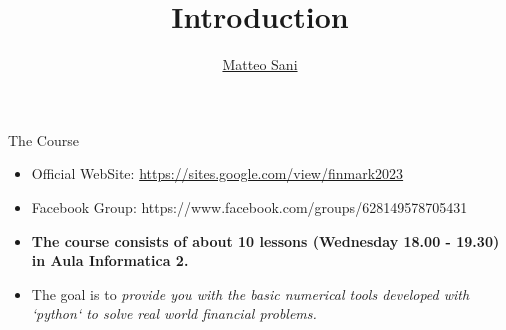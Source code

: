 \documentclass{beamer}
\title{Introduction}
\author{\href{mailto:matteo.sani@unisi.it}{Matteo Sani}}
\begin{document}
\begin{frame}[plain]
	\maketitle
\end{frame}

\begin{frame}{The Course}
  \begin{itemize}
  \item Official WebSite: \href{https://sites.google.com/view/finmark2023}{https://sites.google.com/view/finmark2023}
  \item Facebook Group: https://www.facebook.com/groups/628149578705431
  \item \textbf{The course consists of about 10 lessons (Wednesday 18.00 - 19.30) in Aula Informatica 2.}
  \item The goal is to \emph{provide you with the basic numerical tools developed with `python` to solve real world financial problems.}
  \end{itemize}
\end{frame}
\end{document}
